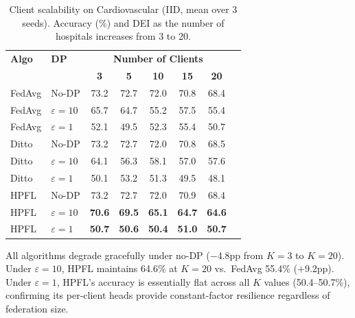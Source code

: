 \documentclass[conference]{IEEEtran}
\begin{document}
\begin{table}[htbp]
\centering
\caption{Client scalability on Cardiovascular (IID, mean over 3 seeds). Accuracy (\%) and DEI as the number of hospitals increases from 3 to 20.}
\label{tab:scalability}
\small
\begin{tabular}{llcccccc}
\toprule
\textbf{Algo} & \textbf{DP} & \multicolumn{5}{c}{\textbf{Number of Clients}} \\
 & & \textbf{3} & \textbf{5} & \textbf{10} & \textbf{15} & \textbf{20} \\
\midrule
FedAvg & No-DP & 73.2 & 72.7 & 72.0 & 70.8 & 68.4 \\
FedAvg & $\varepsilon{=}10$ & 65.7 & 64.7 & 55.2 & 57.5 & 55.4 \\
FedAvg & $\varepsilon{=}1$ & 52.1 & 49.5 & 52.3 & 55.4 & 50.7 \\
\midrule
Ditto & No-DP & 73.2 & 72.7 & 72.0 & 70.8 & 68.5 \\
Ditto & $\varepsilon{=}10$ & 64.1 & 56.3 & 58.1 & 57.0 & 57.6 \\
Ditto & $\varepsilon{=}1$ & 50.1 & 53.2 & 51.3 & 49.5 & 48.1 \\
\midrule
HPFL & No-DP & 73.2 & 72.7 & 72.0 & 70.9 & 68.4 \\
HPFL & $\varepsilon{=}10$ & \textbf{70.6} & \textbf{69.5} & \textbf{65.1} & \textbf{64.7} & \textbf{64.6} \\
HPFL & $\varepsilon{=}1$ & \textbf{50.7} & \textbf{50.6} & \textbf{50.4} & \textbf{51.0} & \textbf{50.7} \\
\bottomrule
\end{tabular}

\vspace{1mm}
\footnotesize{All algorithms degrade gracefully under no-DP ($-$4.8pp from $K{=}3$ to $K{=}20$). Under $\varepsilon{=}10$, HPFL maintains 64.6\% at $K{=}20$ vs.\ FedAvg 55.4\% ($+$9.2pp). Under $\varepsilon{=}1$, HPFL's accuracy is essentially flat across all $K$ values (50.4--50.7\%), confirming its per-client heads provide constant-factor resilience regardless of federation size.}
\end{table}

\end{document}
